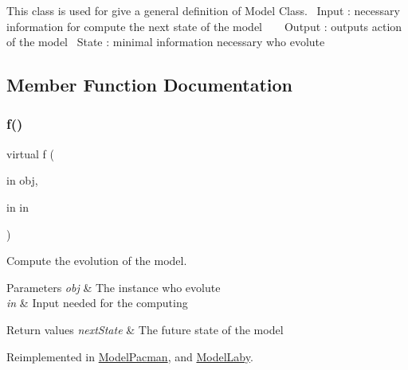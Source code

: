 This class is used for give a general definition of Model Class.~\newline
Input \+: necessary information for compute the next state of the model ~\newline
~\newline
Output \+: output\textquotesingle{}s action of the model~\newline
 State \+: minimal information necessary who evolute ~\newline
 

\subsection{Member Function Documentation}
\mbox{\label{class_model_s_e_d_ac36f9451c43b120828af4380858f2024}} 
\subsubsection{\texorpdfstring{f()}{f()}}
{\footnotesize\ttfamily virtual f (\begin{DoxyParamCaption}\item[{in}]{obj,  }\item[{in}]{in }\end{DoxyParamCaption})\hspace{0.3cm}{\ttfamily [virtual]}}



Compute the evolution of the model. 


\begin{DoxyParams}{Parameters}
{\em obj} & The instance who evolute \\
\hline
{\em in} & Input needed for the computing \\
\hline
\end{DoxyParams}

\begin{DoxyRetVals}{Return values}
{\em next\+State} & The future state of the model \\
\hline
\end{DoxyRetVals}


Reimplemented in \hyperlink{class_model_pacman_a6f3b146c92a207e95690d08975e1e072}{Model\+Pacman}, and \hyperlink{class_model_laby_a6f3b146c92a207e95690d08975e1e072}{Model\+Laby}.

\mbox{\label{class_model_s_e_d_ac6bf71081e35755d5ed9992d165afcb8}} 
